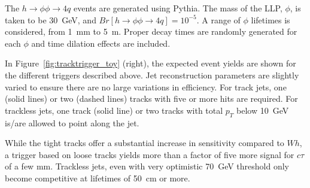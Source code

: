 The $h\rightarrow\phi\phi\rightarrow 4q$ events are generated using Pythia. The mass of the LLP, $\phi$, is taken to be 30~GeV, and $Br[h\rightarrow\phi\phi\rightarrow 4q]=10^{-5}$. A range of $\phi$ lifetimes is considered, from 1~mm to 5~m. Proper decay times are randomly generated for each $\phi$ and time dilation effects are included.

In Figure~\ref{fig:tracktrigger_toy} (right), the expected event yields are shown for the different triggers described above. Jet reconstruction parameters are slightly varied to ensure there are no large variations in efficiency. For track jets, one (solid lines) or two (dashed lines) tracks with five or more hits are required. For trackless jets, one track (solid line) or two tracks with total $p_T$ below 10~GeV is/are allowed to point along the jet.

While the tight tracks offer a substantial increase in sensitivity compared to $Wh$, a trigger based on loose tracks yields more than a factor of five more signal for $c\tau$ of a few mm. Trackless jets, even with very optimistic 70~GeV threshold only become competitive at lifetimes of 50~cm or more.

